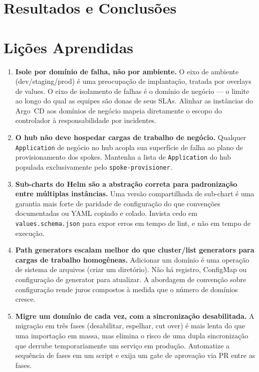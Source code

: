 \documentclass[11pt,a4paper]{article}
\begin{document}
\section{Resultados e Conclusões}
\label{sec:results}

\section{Lições Aprendidas}
\label{sec:lessons}

\begin{enumerate}[leftmargin=1.5em, label=\textbf{L-\arabic*.}]
  \item \textbf{Isole por domínio de falha, não por ambiente.}
    O eixo de ambiente (dev/staging/prod) é uma preocupação de implantação, tratada por
    overlays de values.
    O eixo de isolamento de falhas é o domínio de negócio --- o limite ao longo do qual
    as equipes são donas de seus SLAs.
    Alinhar as instâncias do Argo~CD aos domínios de negócio mapeia diretamente o
    escopo do controlador à responsabilidade por incidentes.

  \item \textbf{O hub não deve hospedar cargas de trabalho de negócio.}
    Qualquer \texttt{Application} de negócio no hub acopla sua superfície de falha ao
    plano de provisionamento dos spokes.
    Mantenha a lista de \texttt{Application} do hub populada exclusivamente pelo
    \texttt{spoke-provisioner}.

  \item \textbf{Sub-charts do Helm são a abstração correta para padronização entre
        múltiplas instâncias.}
    Uma versão compartilhada de sub-chart é uma garantia mais forte de paridade de
    configuração do que convenções documentadas ou YAML copiado e colado.
    Invista cedo em \texttt{values.schema.json} para expor erros em tempo de lint, e
    não em tempo de execução.

  \item \textbf{Path generators escalam melhor do que cluster/list generators para
        cargas de trabalho homogêneas.}
    Adicionar um domínio é uma operação de sistema de arquivos (criar um diretório).
    Não há registro, ConfigMap ou configuração de generator para atualizar.
    A abordagem de convenção sobre configuração rende juros compostos à medida que o
    número de domínios cresce.

  \item \textbf{Migre um domínio de cada vez, com a sincronização desabilitada.}
    A migração em três fases (desabilitar, espelhar, cut over) é mais lenta do que uma
    importação em massa, mas elimina o risco de uma dupla sincronização que derrube
    temporariamente um serviço em produção.
    Automatize a sequência de fases em um script e exija um gate de aprovação via PR
    entre as fases.
\end{enumerate}
\end{document}
